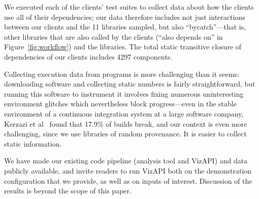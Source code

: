 We executed each of the clients' test suites to collect data about how the clients use all of their dependencies; our data therefore includes not just interactions between our clients and the 11 libraries sampled, but also ``bycatch''---that is, other libraries that are also called by the clients (``also depends on'' in Figure~\ref{fig:workflow}) and the libraries. The total static transitive closure of dependencies of our clients includes 4297 components.

Collecting execution data from programs is more challenging than it seems: downloading software and collecting static numbers is fairly straightforward, but running this software to instrument it involves fixing numerous uninteresting environment glitches which nevertheless block progress---even in the stable environment of a continuous integration system at a large software company, Kerzazi et al~\cite{kerzazi14:_why_do_autom_build_break} found that 17.9\% of builds break, and our context is even more challenging, since we use libraries of random provenance. It is easier to collect static information.

We have made our existing code pipeline (analysis tool and VizAPI) and data publicly available, and invite readers to run VizAPI both on the demonstration configuration that we provide, as well as on inputs of interest. Discussion of the results is beyond the scope of this paper.
